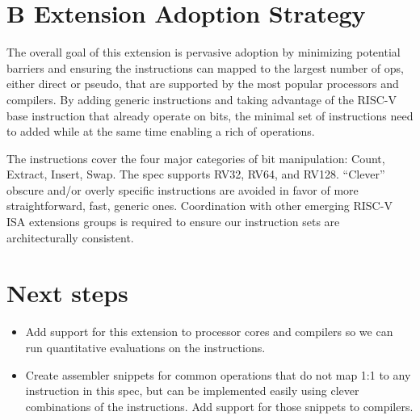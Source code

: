 \section{B Extension Adoption Strategy}

The overall goal of this extension is pervasive adoption by minimizing
potential barriers and ensuring the instructions can mapped to the
largest number of ops, either direct or pseudo, that are supported by
the most popular processors and compilers. By adding generic
instructions and taking advantage of the RISC-V base instruction that
already operate on bits, the minimal set of instructions need to added
while at the same time enabling a rich of operations.

The instructions cover the four major categories of bit manipulation: Count,
Extract, Insert, Swap. The spec supports RV32, RV64, and RV128. ``Clever''
obscure and/or overly specific instructions are avoided in favor of more
straightforward, fast, generic ones.  Coordination with other emerging RISC-V
ISA extensions groups is required to ensure our instruction sets are
architecturally consistent.

\section{Next steps}

\begin{itemize}
\item
  Add support for this extension to processor cores and compilers
  so we can run quantitative evaluations on the instructions.
\item
  Create assembler snippets for common operations that do not map 1:1
  to any instruction in this spec, but can be implemented easily using
  clever combinations of the instructions. Add support for those snippets
  to compilers.
\end{itemize}

